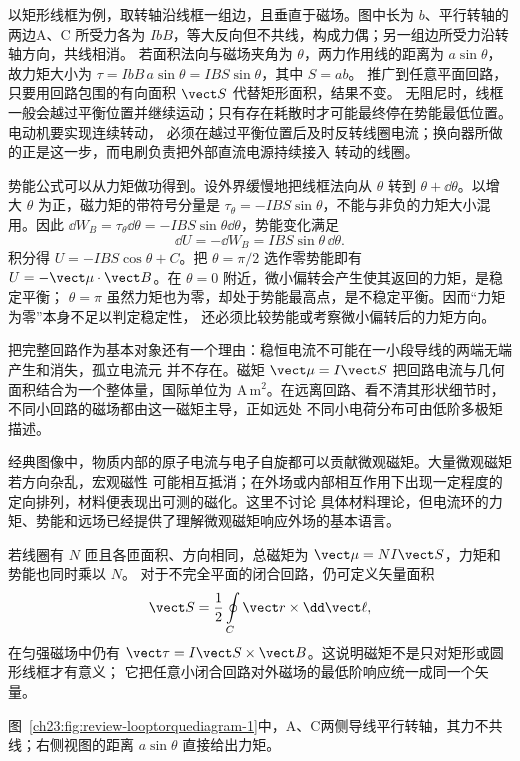 以矩形线框为例，取转轴沿线框一组边，且垂直于磁场。图中长为 $b$、平行转轴的两边A、C
所受力各为 $IbB$，等大反向但不共线，构成力偶；另一组边所受力沿转轴方向，共线相消。
若面积法向与磁场夹角为 $\theta$，两力作用线的距离为 $a\sin\theta$，故力矩大小为
$\tau=IbB\,a\sin\theta=IBS\sin\theta$，其中 $S=ab$。
推广到任意平面回路，只要用回路包围的有向面积 $\vect S$ 代替矩形面积，结果不变。
无阻尼时，线框一般会越过平衡位置并继续运动；只有存在耗散时才可能最终停在势能最低位置。电动机要实现连续转动，
必须在越过平衡位置后及时反转线圈电流；换向器所做的正是这一步，而电刷负责把外部直流电源持续接入
转动的线圈。

势能公式可以从力矩做功得到。设外界缓慢地把线框法向从 $\theta$ 转到
$\theta+\dd\theta$。以增大 $\theta$ 为正，磁力矩的带符号分量是
$\tau_\theta=-IBS\sin\theta$，不能与非负的力矩大小混用。因此
$\dd W_B=\tau_\theta\dd\theta=-IBS\sin\theta\dd\theta$，势能变化满足
\begin{equation}
  \dd U=-\dd W_B=IBS\sin\theta\,\dd\theta.
\end{equation}
积分得 $U=-IBS\cos\theta+C$。把 $\theta=\pi/2$ 选作零势能即有
$U=-\vect\mu\cdot\vect B$。在 $\theta=0$ 附近，微小偏转会产生使其返回的力矩，是稳定平衡；
$\theta=\pi$ 虽然力矩也为零，却处于势能最高点，是不稳定平衡。因而“力矩为零”本身不足以判定稳定性，
还必须比较势能或考察微小偏转后的力矩方向。

把完整回路作为基本对象还有一个理由：稳恒电流不可能在一小段导线的两端无端产生和消失，孤立电流元
并不存在。磁矩 $\vect\mu=I\vect S$ 把回路电流与几何面积结合为一个整体量，国际单位为
$\mathrm{A\,m^2}$。在远离回路、看不清其形状细节时，不同小回路的磁场都由这一磁矩主导，正如远处
不同小电荷分布可由低阶多极矩描述。

经典图像中，物质内部的原子电流与电子自旋都可以贡献微观磁矩。大量微观磁矩若方向杂乱，宏观磁性
可能相互抵消；在外场或内部相互作用下出现一定程度的定向排列，材料便表现出可测的磁化。这里不讨论
具体材料理论，但电流环的力矩、势能和远场已经提供了理解微观磁矩响应外场的基本语言。

若线圈有 $N$ 匝且各匝面积、方向相同，总磁矩为 $\vect\mu=NI\vect S$，力矩和势能也同时乘以 $N$。
对于不完全平面的闭合回路，仍可定义矢量面积
\begin{equation}
  \vect S=\frac12\oint\limits_C\vect r\times\dd\vect\ell,
\end{equation}
在匀强磁场中仍有 $\vect\tau=I\vect S\times\vect B$。这说明磁矩不是只对矩形或圆形线框才有意义；
它把任意小闭合回路对外磁场的最低阶响应统一成同一个矢量。

图~\ref{ch23:fig:review-looptorquediagram-1}中，A、C两侧导线平行转轴，其力不共线；右侧视图的距离 $a\sin\theta$ 直接给出力矩。
\par\noindent\begin{minipage}{\linewidth}
\loopTorqueDiagram
{}\label{ch23:fig:review-looptorquediagram-1}
\end{minipage}\par\medskip

